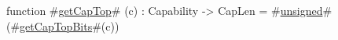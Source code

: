 function #\hyperref[sailRISCVzgetCapTop]{getCapTop}# (c) : Capability -> CapLen =
    #\hyperref[sailRISCVzunsigned]{unsigned}#(#\hyperref[sailRISCVzgetCapTopBits]{getCapTopBits}#(c))

